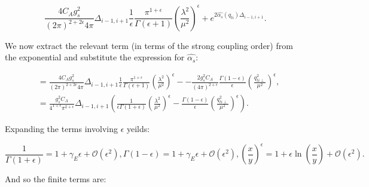 		\begin{equation}
			\frac{4C_Ag_s^2}{(2\pi)^{2+2\epsilon}4\pi}\Delta_{i-1, i+1}\frac{1}{\epsilon}\frac{\pi^{1+\epsilon}}
			{\Gamma(\epsilon+1)}\left(\frac{\lambda^2}{\mu^2}\right)^\epsilon + e^{2\hat{\alpha_s}(q_{ti})\Delta_{i-1,i+1}}.
		\end{equation}

		We now extract the relevant term (in terms of the strong coupling order) from the
		exponential and substitute the expression for $\hat{\alpha_s}$:

		\begin{align}
			&= \frac{4C_Ag_s^2}{(2\pi)^{2+2\epsilon}4\pi}\Delta_{i-1, i+1}\frac{1}{\epsilon}\frac{\pi^{1+\epsilon}}
			{\Gamma(\epsilon+1)}\left(\frac{\lambda^2}{\mu^2}\right)^\epsilon - -\frac{2g_s^2C_A}{(4\pi)^{2+\epsilon}}
			\frac{\Gamma(1-\epsilon)}{\epsilon}\left(\frac{q_{ti\perp}^2}{\mu^2}\right)^\epsilon, \\
			&= \frac{g_s^2C_A}{4^{1+\epsilon}\pi^{2+\epsilon}}\Delta_{i-1, i+1}\left(\frac{1}{\epsilon\Gamma(1+\epsilon)}
			\left(\frac{\lambda^2}{\mu^2}\right)^\epsilon - \frac{\Gamma(1-\epsilon)}{\epsilon}
			\left(\frac{q_{ti\perp}^2}{\mu^2}\right)^\epsilon\right).
		\end{align}

		Expanding the terms involving $\epsilon$ yeilds:

		\begin{subequations}
		\begin{equation}
		\frac{1}{\Gamma(1+\epsilon)} = 1 + \gamma_E\epsilon + \mathcal{O}(\epsilon^2),
		\end{equation}
		\begin{equation}
		\Gamma(1-\epsilon) = 1 + \gamma_E\epsilon + \mathcal{O}(\epsilon^2),
		\end{equation}
		\begin{equation}
		\left(\frac{x}{y}\right)^\epsilon = 1 + \epsilon\ln\left(\frac{x}{y}\right) + \mathcal{O}(\epsilon^2).
		\end{equation}
		\end{subequations}

		And so the finite terms are:


